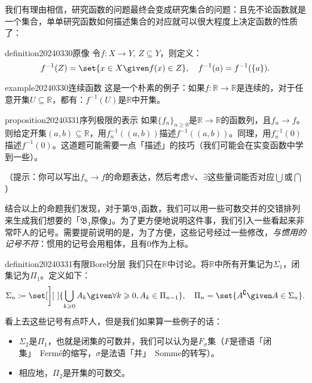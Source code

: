 \documentclass{daily}
\begin{document}
\begin{epigraphs}
\end{epigraphs}

我们有理由相信，研究函数的问题最终会变成研究集合的问题：且先不论函数就是一个集合，单单研究函数如何描述集合的对应就可以很大程度上决定函数的性质了：

\begin{daily}{definition}{20240330}{原像}
	令$f\colon X\to Y$, $Z\subseteq  Y$，则定义：
	\[f^{-1}(Z) = \set{x\in X\given f(x)\in Z},\quad f^{-1}(a) = f^{-1}(\{a\}).\]
\end{daily}


\begin{daily}{example}{20240330}{连续函数}
	这是一个朴素的例子：如果$f\colon\mathbb R\to\mathbb R$是连续的，对于任意开集$U\subseteq \mathbb R$，都有：$f^{-1}(U)$是$\mathbb R$中开集。
\end{daily}

\begin{daily}{proposition}{20240331}{序列极限的表示}
	如果$\{f_n\}_{n\geqslant 0}$是$\mathbb R\to\mathbb R$的函数列，且$f_n\to f$。则给定开集$(a,b)\subseteq \mathbb R$，用$f_n^{-1}((a,b))$描述$f^{-1}((a,b))$。同理，用$f_n^{-1}(0)$描述$f^{-1}(0)$。这道题可能需要一点「描述」的技巧（我们可能会在实变函数中学到一些）。

	（提示：你可以写出$f_n\to f$的命题表达，然后考虑$\forall$、$\exists$这些量词能否对应$\bigcup$或$\bigcap$）
\end{daily}

结合以上的命题我们发现，对于第$\mathfrak B_1$函数，我们可以用一些可数交并的交错排列来生成我们想要的「$\mathfrak B_1$原像」。为了更方便地说明这件事，我们引入一些看起来非常吓人的记号。需要提前说明的是，为了方便，这些记号经过一些修改，\emph{与惯用的记号不符}：惯用的记号会用粗体，且有$0$作为上标。

\begin{daily}{definition}{20240331}{有限Borel分层}
	我们只在$\mathbb R$中讨论。将$\mathbb R$中所有开集记为$\Sigma_1$，闭集记为$\Pi_1$。定义如下：
	\[\Sigma_n\coloneqq\set[\bigg][~]{\bigcup_{k\geqslant 0}A_k\given \forall k\geqslant 0, A_k\in \Pi_{n-1}},\quad \Pi_n=\set{A^\complement\given A\in\Sigma_n}.\]
	看上去这些记号有点吓人，但是我们如果算一些例子的话：
	\begin{itemize}
		\item $\Sigma_2$是$\Pi_1$，也就是闭集的可数并，我们可以认为是$F_{\sigma}$集（$F$是德语「闭集」~Fermé的缩写，$\sigma$是法语「并」~Somme的转写）。
		\item 相应地，$\Pi_2$是开集的可数交。
	\end{itemize}
\end{daily}
\end{document}
